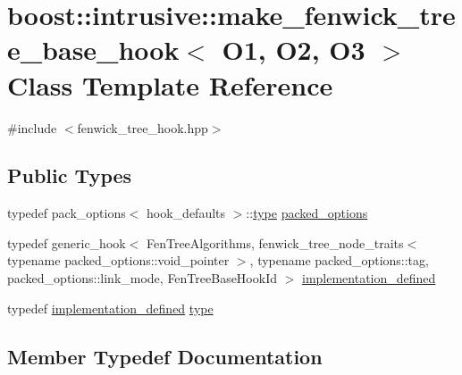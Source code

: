 \hypertarget{classboost_1_1intrusive_1_1make__fenwick__tree__base__hook}{}\section{boost\+:\+:intrusive\+:\+:make\+\_\+fenwick\+\_\+tree\+\_\+base\+\_\+hook$<$ O1, O2, O3 $>$ Class Template Reference}
\label{classboost_1_1intrusive_1_1make__fenwick__tree__base__hook}


{\ttfamily \#include $<$fenwick\+\_\+tree\+\_\+hook.\+hpp$>$}

\subsection*{Public Types}
\begin{DoxyCompactItemize}
\item 
typedef pack\+\_\+options$<$ hook\+\_\+defaults $>$\+::\hyperlink{classboost_1_1intrusive_1_1make__fenwick__tree__base__hook_ac194b5544afb5fb14dca7765784c8eb7}{type} \hyperlink{classboost_1_1intrusive_1_1make__fenwick__tree__base__hook_af7deddd956f4b6beda854f8c98dcf637}{packed\+\_\+options}
\item 
typedef generic\+\_\+hook$<$ Fen\+Tree\+Algorithms, fenwick\+\_\+tree\+\_\+node\+\_\+traits$<$ typename packed\+\_\+options\+::void\+\_\+pointer $>$, typename packed\+\_\+options\+::tag, packed\+\_\+options\+::link\+\_\+mode, Fen\+Tree\+Base\+Hook\+Id $>$ \hyperlink{classboost_1_1intrusive_1_1make__fenwick__tree__base__hook_af661b0546c575716fb1fc71c0446929c}{implementation\+\_\+defined}
\item 
typedef \hyperlink{classboost_1_1intrusive_1_1make__fenwick__tree__base__hook_af661b0546c575716fb1fc71c0446929c}{implementation\+\_\+defined} \hyperlink{classboost_1_1intrusive_1_1make__fenwick__tree__base__hook_ac194b5544afb5fb14dca7765784c8eb7}{type}
\end{DoxyCompactItemize}


\subsection{Member Typedef Documentation}
\mbox{\label{classboost_1_1intrusive_1_1make__fenwick__tree__base__hook_af661b0546c575716fb1fc71c0446929c}} 
